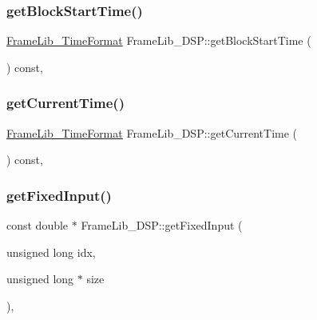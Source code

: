 \subsubsection{\texorpdfstring{get\+Block\+Start\+Time()}{getBlockStartTime()}}
{\footnotesize\ttfamily \hyperlink{struct_frame_lib___time_format}{Frame\+Lib\+\_\+\+Time\+Format} Frame\+Lib\+\_\+\+D\+S\+P\+::get\+Block\+Start\+Time (\begin{DoxyParamCaption}{ }\end{DoxyParamCaption}) const\hspace{0.3cm}{\ttfamily [inline]}, {\ttfamily [protected]}}

\mbox{\label{class_frame_lib___d_s_p_a5734f973e603be4a85764d5f77fa4004}} 
\subsubsection{\texorpdfstring{get\+Current\+Time()}{getCurrentTime()}}
{\footnotesize\ttfamily \hyperlink{struct_frame_lib___time_format}{Frame\+Lib\+\_\+\+Time\+Format} Frame\+Lib\+\_\+\+D\+S\+P\+::get\+Current\+Time (\begin{DoxyParamCaption}{ }\end{DoxyParamCaption}) const\hspace{0.3cm}{\ttfamily [inline]}, {\ttfamily [protected]}}

\mbox{\label{class_frame_lib___d_s_p_aabcf3bae08ab571f455f08bd7cf5e625}} 
\subsubsection{\texorpdfstring{get\+Fixed\+Input()}{getFixedInput()}}
{\footnotesize\ttfamily const double $\ast$ Frame\+Lib\+\_\+\+D\+S\+P\+::get\+Fixed\+Input (\begin{DoxyParamCaption}\item[{unsigned long}]{idx,  }\item[{unsigned long $\ast$}]{size }\end{DoxyParamCaption})\hspace{0.3cm}{\ttfamily [final]}, {\ttfamily [virtual]}}



